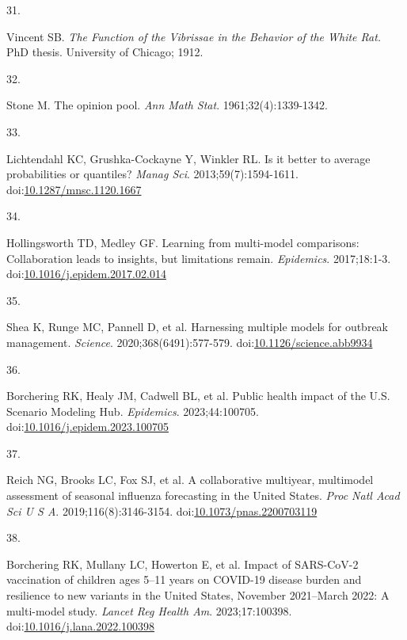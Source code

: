 \documentclass[
]{article}
\newlength{\cslhangindent}
\newlength{\csllabelwidth}
\newenvironment{CSLReferences}[2] %
 {\begin{list}{}{%
  \setlength{\itemindent}{0pt}
  \setlength{\leftmargin}{0pt}
  \setlength{\parsep}{0pt}
  \ifodd #1
   \setlength{\leftmargin}{\cslhangindent}
   \setlength{\itemindent}{-1\cslhangindent}
  \fi
  \setlength{\itemsep}{#2\baselineskip}}}
 {\end{list}}
\newcommand{\CSLLeftMargin}[1]{\parbox[t]{\csllabelwidth}{\strut#1\strut}}
\newcommand{\CSLRightInline}[1]{\parbox[t]{\linewidth - \csllabelwidth}{\strut#1\strut}}
\begin{document}
\begin{CSLReferences}{0}{1}
\CSLLeftMargin{31. }%
\CSLRightInline{Vincent SB. \emph{The Function of the Vibrissae in the
Behavior of the White Rat.} PhD thesis. University of Chicago; 1912.}

\CSLLeftMargin{32. }%
\CSLRightInline{Stone M. The opinion pool. \emph{Ann Math Stat}.
1961;32(4):1339-1342.}

\CSLLeftMargin{33. }%
\CSLRightInline{Lichtendahl KC, Grushka-Cockayne Y, Winkler RL. Is it
better to average probabilities or quantiles? \emph{Manag Sci}.
2013;59(7):1594-1611.
doi:\href{https://doi.org/10.1287/mnsc.1120.1667}{10.1287/mnsc.1120.1667}}

\CSLLeftMargin{34. }%
\CSLRightInline{Hollingsworth TD, Medley GF. Learning from multi-model
comparisons: {Collaboration} leads to insights, but limitations remain.
\emph{Epidemics}. 2017;18:1-3.
doi:\href{https://doi.org/10.1016/j.epidem.2017.02.014}{10.1016/j.epidem.2017.02.014}}

\CSLLeftMargin{35. }%
\CSLRightInline{Shea K, Runge MC, Pannell D, et al. Harnessing multiple
models for outbreak management. \emph{Science}. 2020;368(6491):577-579.
doi:\href{https://doi.org/10.1126/science.abb9934}{10.1126/science.abb9934}}

\CSLLeftMargin{36. }%
\CSLRightInline{Borchering RK, Healy JM, Cadwell BL, et al. Public
health impact of the {U}.{S}. {Scenario} {Modeling} {Hub}.
\emph{Epidemics}. 2023;44:100705.
doi:\href{https://doi.org/10.1016/j.epidem.2023.100705}{10.1016/j.epidem.2023.100705}}

\CSLLeftMargin{37. }%
\CSLRightInline{Reich NG, Brooks LC, Fox SJ, et al. A collaborative
multiyear, multimodel assessment of seasonal influenza forecasting in
the {United} {States}. \emph{Proc Natl Acad Sci U S A}.
2019;116(8):3146-3154.
doi:\href{https://doi.org/10.1073/pnas.2200703119}{10.1073/pnas.2200703119}}

\CSLLeftMargin{38. }%
\CSLRightInline{Borchering RK, Mullany LC, Howerton E, et al. Impact of
{SARS}-{CoV}-2 vaccination of children ages 5--11 years on {COVID}-19
disease burden and resilience to new variants in the {United} {States},
{November} 2021--{March} 2022: {A} multi-model study. \emph{Lancet Reg
Health Am}. 2023;17:100398.
doi:\href{https://doi.org/10.1016/j.lana.2022.100398}{10.1016/j.lana.2022.100398}}


\end{CSLReferences}
\end{document}
